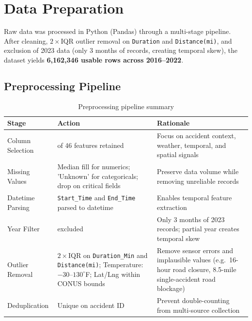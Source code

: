 
\section{Data Preparation}

Raw data was processed in Python (Pandas) through a multi-stage pipeline.
After cleaning, $2\times$IQR outlier removal on \texttt{Duration} and
\texttt{Distance(mi)}, and exclusion of 2023 data (only 3 months of records,
creating temporal skew), the dataset yields \textbf{ 6,162,346 usable
rows across 2016--2022}.

\subsection{Preprocessing Pipeline}
\begin{table}[!htbp]
\centering\small
\begin{tabularx}{\linewidth}{@{} >{\raggedright\arraybackslash}p{3cm} >{\raggedright\arraybackslash}p{4cm} X @{}}
  \toprule
  \textbf{Stage} & \textbf{Action} & \textbf{Rationale} \\ \midrule

  Column Selection
    & 21 of 46 features retained
    & Focus on accident context, weather, temporal, and spatial signals \\

  Missing Values
    & Median fill for numerics; 'Unknown' for categoricals; drop on critical fields
    & Preserve data volume while removing unreliable records \\

  Datetime Parsing
    & \texttt{Start\_Time} and \texttt{End\_Time} parsed to datetime
    & Enables temporal feature extraction \\

  Year Filter
    & 2023 excluded
    & Only 3 months of 2023 records; partial year creates temporal skew \\

  Outlier Removal
    & $2\times$IQR on \texttt{Duration\_Min} and \texttt{Distance(mi)}; Temperature: $-30$--$130^\circ$F; Lat/Lng within CONUS bounds
    & Remove sensor errors and implausible values (e.g.\ 16-hour road closure, 8.5-mile single-accident road blockage) \\

  Deduplication
    & Unique on accident ID
    & Prevent double-counting from multi-source collection \\

  \bottomrule
\end{tabularx}
\caption{Preprocessing pipeline summary}
\end{table}
\clearpage

